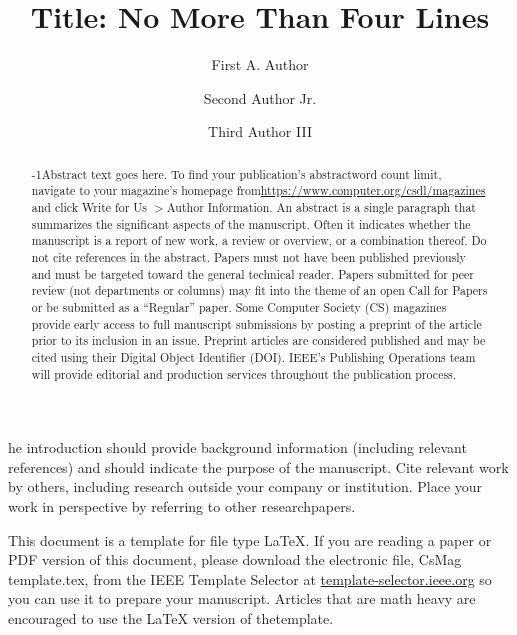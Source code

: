 \documentclass{IEEEcsmag}
\begin{document}

\title{Title: No More Than Four Lines}

\author{First A. Author}

\author{Second Author Jr.}

\author{Third Author III}


\begin{abstract}\looseness-1Abstract text goes here. To find your publication's abstract\break word count limit, navigate to your magazine's homepage from\break \href{https://www.computer.org/csdl/magazines}{https://www.computer.org/csdl/magazines} and click Write for Us $>$Author Information. An abstract is a single paragraph that summarizes the significant aspects of the manuscript. Often it indicates whether the manuscript is a report of new work, a review or overview, or a combination thereof. Do not cite references in the abstract. Papers must not have been published previously and must be targeted toward the general technical reader. Papers submitted for peer review (not departments or columns) may fit into the theme of an open Call for Papers or be submitted as a ``Regular'' paper. Some Computer Society (CS) magazines provide early access to full manuscript submissions by posting a preprint of the article prior to its inclusion in an issue. Preprint articles are considered published and may be cited using their Digital Object Identifier (DOI). IEEE's Publishing Operations team will provide editorial and production services throughout the publication process.
\end{abstract}

\maketitle


he introduction should provide background information (including relevant references) and should indicate the purpose of the manuscript. Cite relevant work by others, including research outside your company or institution. Place your work in perspective by referring to other research\break papers.


This document is a template for file type LaTeX. If you are reading a paper or PDF version of this document, please download the electronic file, CsMag template.tex, from the IEEE Template Selector at \href{https://template-selector.ieee.org}{template-selector.ieee.org} so you can use it to prepare your manuscript. Articles that are math heavy are encouraged to use the LaTeX version of the\break  template.
\end{document}
